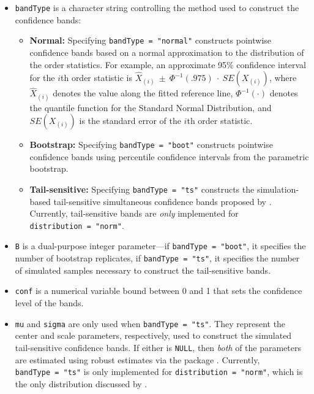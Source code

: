 \begin{itemize}
\item
  \texttt{bandType} is a character string controlling the method used to
  construct the confidence bands:

  \begin{itemize}
  \tightlist
  \item
    \textbf{Normal:} Specifying \texttt{bandType\ =\ "normal"}
    constructs pointwise confidence bands based on a normal
    approximation to the distribution of the order statistics. For
    example, an approximate 95\% confidence interval for the \(i\)th
    order statistic is
    \(\widehat{X}_{(i)}~\pm~\Phi^{-1}(.975)~\cdot~SE(X_{(i)})\), where
    \(\widehat{X}_{(i)}\) denotes the value along the fitted reference
    line, \(\Phi^{-1}(\cdot)\) denotes the quantile function for the
    Standard Normal Distribution, and \(SE(X_{(i)})\) is the standard
    error of the \(i\)th order statistic.
  \item
    \textbf{Bootstrap:} Specifying \texttt{bandType\ =\ "boot"}
    constructs pointwise confidence bands using percentile confidence
    intervals from the parametric bootstrap.
  \item
    \textbf{Tail-sensitive:} Specifying \texttt{bandType\ =\ "ts"}
    constructs the simulation-based tail-sensitive simultaneous
    confidence bands proposed by \citet{Aldor-Noiman2013-xw}. Currently,
    tail-sensitive bands are \emph{only} implemented for
    \texttt{distribution\ =\ "norm"}.
  \end{itemize}
\item
  \texttt{B} is a dual-purpose integer parameter---if
  \texttt{bandType\ =\ "boot"}, it specifies the number of bootstrap
  replicates, if \texttt{bandType\ =\ "ts"}, it specifies the number of
  simulated samples necessary to construct the tail-sensitive bands.
\item
  \texttt{conf} is a numerical variable bound between 0 and 1 that sets
  the confidence level of the bands.
\item
  \texttt{mu} and \texttt{sigma} are only used when
  \texttt{bandType\ =\ "ts"}. They represent the center and scale
  parameters, respectively, used to construct the simulated
  tail-sensitive confidence bands. If either is \texttt{NULL}, then
  \emph{both} of the parameters are estimated using robust estimates via
  the  package \citep{robustbase}. Currently,
  \texttt{bandType\ =\ "ts"} is only implemented for
  \texttt{distribution\ =\ "norm"}, which is the only distribution
  discussed by \citet{Aldor-Noiman2013-xw}.
\end{itemize}

